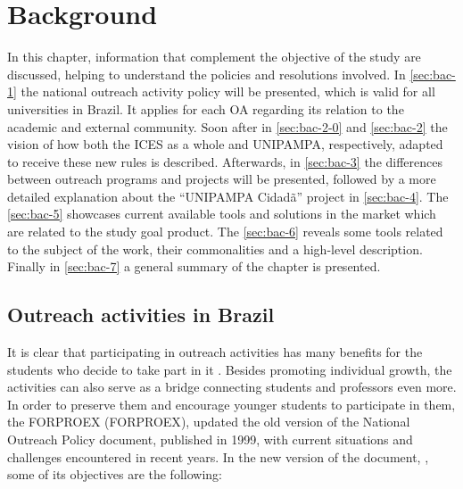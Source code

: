 \chapter{Background}\label{background}

In this chapter, information that complement the objective of the study are discussed, helping to understand the policies and resolutions involved. In \autoref{sec:bac-1} the national outreach activity policy will be presented, which is valid for all universities in Brazil. It applies for each \ac{OA} regarding its relation to the academic and external community. Soon after in \autoref{sec:bac-2-0} and \autoref{sec:bac-2} the vision of how both the \ac{ICES} as a whole and \acl{UNIPAMPA}, respectively, adapted to receive these new rules is described. Afterwards, in \autoref{sec:bac-3} the differences between outreach programs and projects will be presented, followed by a more detailed explanation about the ``\ac{UNIPAMPA} Cidadã'' project in \autoref{sec:bac-4}. The \autoref{sec:bac-5} showcases current available tools and solutions in the market which are related to the study goal product. The \autoref{sec:bac-6} reveals some tools related to the subject of the work, their commonalities and a high-level description. Finally in \autoref{sec:bac-7} a general summary of the chapter is presented.

\section{Outreach activities in Brazil}\label{sec:bac-1}

It is clear that participating in outreach activities has many benefits for the students who decide to take part in it \cite{sellou2011many}. Besides promoting individual growth, the activities can also serve as a bridge connecting students and professors even more. In order to preserve them and encourage younger students to participate in them, the \acl{FORPROEX} (\ac{FORPROEX}), updated the old version of the National Outreach Policy document, published in 1999, with current situations and challenges encountered in recent years. In the new version of the document, \cite{politicaNacional}, some of its objectives are the following:

